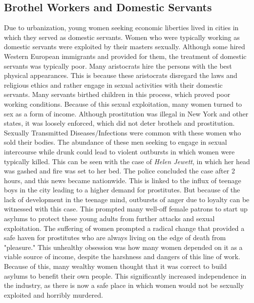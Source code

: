 \documentclass{article}
\begin{document}
\subsection{Brothel Workers and Domestic Servants}
Due to urbanization, young women seeking economic liberties lived in cities in which they served as domestic servants. Women who were typically working as domestic servants were exploited by their masters sexually. Although some hired Western European immigrants and provided for them, \parencite{west1992} the treatment of domestic servants was typically poor. Many aristocrats hire the persons with the best physical appearances. This is because these aristocrats disregard the laws and religious ethics and rather engage in sexual activities with their domestic servants. Many servants birthed children in this process, which proved poor working conditions. Because of this sexual exploitation, many women turned to sex as a form of income. Although prostitution was illegal in New York and other states, it was loosely enforced, which did not deter brothels and prostitution. Sexually Transmitted Diseases/Infections were common with these women who sold their bodies. The abundance of these men seeking to engage in sexual intercourse while drunk could lead to violent outbursts in which women were typically killed. This can be seen with the case of \emph{Helen Jewett}, in which her head was gashed and fire was set to her bed. The police concluded the case after 2 hours, and this news became nationwide. This is linked to the influx of teenage boys in the city leading to a higher demand for prostitutes. But because of the lack of development in the teenage mind, outbursts of anger due to loyalty can be witnessed with this case. \parencite{patricia1836} This prompted many well-off female patrons to start up asylums to protect these young adults from further attacks and sexual exploitation. \parencite{lee2006} The suffering of women prompted a radical change that provided a safe haven for prostitutes who are always living on the edge of death from "pleasure." This unhealthy obsession was how many women depended on it as a viable source of income, despite the harshness and dangers of this line of work. Because of this, many wealthy women thought that it was correct to build asylums to benefit their own people. This significantly increased independence in the industry, as there is now a safe place in which women would not be sexually exploited and horribly murdered.
\end{document}

